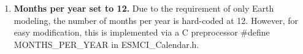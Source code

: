 
\begin{enumerate}

\item {\bf Months per year set to 12.} Due to the requirement of only Earth modeling, the number of months per year is hard-coded at 12.  However, for easy modification, this is implemented via a C preprocessor \#define MONTHS\_PER\_YEAR in ESMCI\_Calendar.h.

\end{enumerate}
